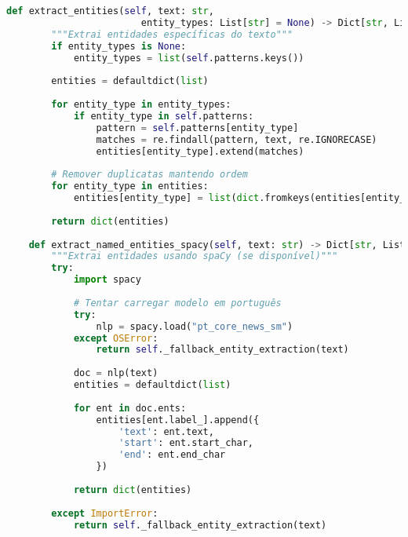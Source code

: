 \begin{pythonbox}
\begin{lstlisting}[language=Python]   
    def extract_entities(self, text: str, 
                        entity_types: List[str] = None) -> Dict[str, List[str]]:
        """Extrai entidades específicas do texto"""
        if entity_types is None:
            entity_types = list(self.patterns.keys())
            
        entities = defaultdict(list)
        
        for entity_type in entity_types:
            if entity_type in self.patterns:
                pattern = self.patterns[entity_type]
                matches = re.findall(pattern, text, re.IGNORECASE)
                entities[entity_type].extend(matches)
                
        # Remover duplicatas mantendo ordem
        for entity_type in entities:
            entities[entity_type] = list(dict.fromkeys(entities[entity_type]))
            
        return dict(entities)
    
    def extract_named_entities_spacy(self, text: str) -> Dict[str, List[Dict]]:
        """Extrai entidades usando spaCy (se disponível)"""
        try:
            import spacy
            
            # Tentar carregar modelo em português
            try:
                nlp = spacy.load("pt_core_news_sm")
            except OSError:
                return self._fallback_entity_extraction(text)
            
            doc = nlp(text)
            entities = defaultdict(list)
            
            for ent in doc.ents:
                entities[ent.label_].append({
                    'text': ent.text,
                    'start': ent.start_char,
                    'end': ent.end_char
                })
                
            return dict(entities)
            
        except ImportError:
            return self._fallback_entity_extraction(text)
\end{lstlisting}
\end{pythonbox}

\newpage

